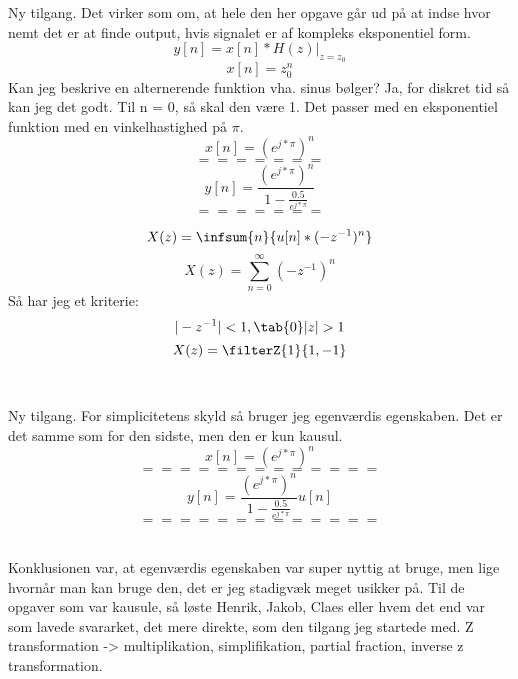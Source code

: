 \begin{Opgaver}
\begin{kapitel}[Z transformation]
\begin{Opgave}
\begin{UnderOpgave}[\text{$x[n] = (-1)^n,\tab{0} -\infty < n < \infty$}]
                \color{black}
                Ny tilgang. Det virker som om, at hele den her opgave går ud på at indse hvor nemt det er at finde output, hvis signalet er af kompleks eksponentiel form. 
                \[y[n] = x[n]*H(z)|_{z=z_0}\]
                \[x[n] = z_0^n\]
                Kan jeg beskrive en alternerende funktion vha. sinus bølger? Ja, for diskret tid så kan jeg det godt.
                Til n = 0, så skal den være 1. Det passer med en eksponentiel funktion med en vinkelhastighed på $\pi$. 
                \[x[n] = (e^{j*\pi})^n\]
                \[=======\]
                \[y[n] = \frac{(e^{j*\pi})^n}{1 - \frac{0.5}{e^{j*\pi}}}\]
                \[=======\]
            \end{UnderOpgave}
            \begin{UnderOpgave}[\text{$x[n] = (-1)^nu[n]$}]
                \color{red}
                \[X(z) = \infsum{n}{u[n]*(-z^{-1})^n}\]
                \[X(z) = \sum_{n=0}^{\infty}{(-z^{-1})^n}\]
                Så har jeg et kriterie: 
                \[|-z^{-1}| < 1,\tab{0} |z| > 1\] 
                \[X(z) = \filterZ{1}{1, -1}\]\\\\
                \color{black}
                Ny tilgang. For simplicitetens skyld så bruger jeg egenværdis egenskaben. 
                Det er det samme som for den sidste, men den er kun kausul. 
                \[x[n] = (e^{j*\pi})^n\]
                \[=============\]
                \[y[n] = \frac{(e^{j*\pi})^n}{1 - \frac{0.5}{e^{j*\pi}}}u[n]\]
                \[=============\]
            \end{UnderOpgave}\\
            Konklusionen var, at egenværdis egenskaben var super nyttig at bruge, men lige hvornår man kan bruge den, det er jeg stadigvæk meget usikker på. 
            Til de opgaver som var kausule, så løste Henrik, Jakob, Claes eller hvem det end var som lavede svararket, det mere direkte, som den tilgang jeg startede med.
            Z transformation -> multiplikation, simplifikation, partial fraction, inverse z transformation. 


\end{Opgave}
\end{kapitel}
\end{Opgaver}
